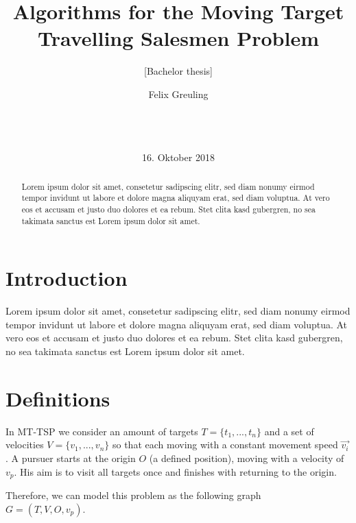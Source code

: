 \documentclass{acm_proc_article-sp}
\begin{document}
\title{Algorithms for the Moving Target Travelling Salesmen Problem}
\subtitle{[Bachelor thesis]}
\author{
\alignauthor
Felix Greuling\\
       \\ 
       \\
       \\ 
}
\date{16. Oktober 2018}
\maketitle

\begin{abstract}
Lorem ipsum dolor sit amet, consetetur sadipscing elitr, sed diam nonumy eirmod tempor invidunt ut labore et dolore magna aliquyam erat, sed diam voluptua. At vero eos et accusam et justo duo dolores et ea rebum. Stet clita kasd gubergren, no sea takimata sanctus est Lorem ipsum dolor sit amet.
\end{abstract}

\section{Introduction}
Lorem ipsum dolor sit amet, consetetur sadipscing elitr, sed diam nonumy eirmod tempor invidunt ut labore et dolore magna aliquyam erat, sed diam voluptua. At vero eos et accusam et justo duo dolores et ea rebum. Stet clita kasd gubergren, no sea takimata sanctus est Lorem ipsum dolor sit amet.

\section{Definitions}
In MT-TSP we consider an amount of targets $T=\{t_1,...,t_n\}$ and a set of velocities $V=\{v_1,...,v_n\}$ so that each moving with a constant movement speed $\overrightarrow{v_i}$. A pursuer starts at the origin $O$ (a defined position), moving with a velocity of $v_p$. His aim is to visit all targets once and finishes with returning to the origin.

Therefore, we can model this problem as the following graph \\
$G=(T, V, O, v_p)$. 
\end{document}
